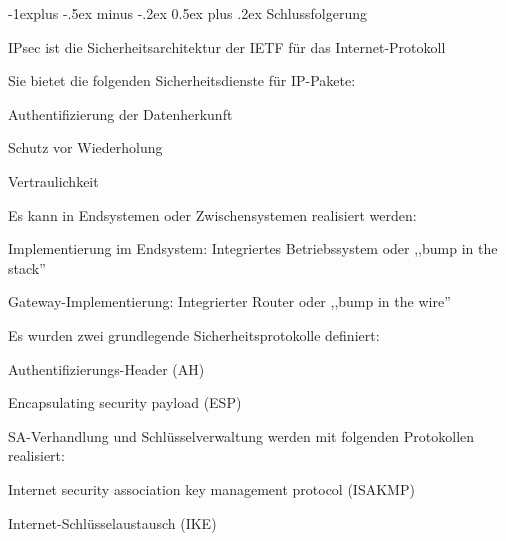 \documentclass[a4paper]{article}
\makeatletter
\renewcommand{\subsection}{\@startsection{subsection}{2}{0mm}%
 {-1explus -.5ex minus -.2ex}%
 {0.5ex plus .2ex}%
 {\normalfont\normalsize\bfseries}}
\makeatother
\begin{document}
\begin{multicols}{3}
      \subsection{Schlussfolgerung}
      \begin{itemize*}
            \item IPsec ist die Sicherheitsarchitektur der IETF für das Internet-Protokoll
            \item Sie bietet die folgenden Sicherheitsdienste für IP-Pakete:
            \begin{itemize*}
                  \item Authentifizierung der Datenherkunft
                  \item Schutz vor Wiederholung
                  \item Vertraulichkeit
            \end{itemize*}
            \item Es kann in Endsystemen oder Zwischensystemen realisiert werden:
            \begin{itemize*}
                  \item Implementierung im Endsystem: Integriertes Betriebssystem oder ,,bump in the stack''
                  \item Gateway-Implementierung: Integrierter Router oder ,,bump in the wire''
            \end{itemize*}
            \item Es wurden zwei grundlegende Sicherheitsprotokolle definiert:
            \begin{itemize*}
                  \item Authentifizierungs-Header (AH)
                  \item Encapsulating security payload (ESP)
            \end{itemize*}
            \item SA-Verhandlung und Schlüsselverwaltung werden mit folgenden
            Protokollen realisiert:
            \begin{itemize*}
                  \item Internet security association key management protocol (ISAKMP)
                  \item Internet-Schlüsselaustausch (IKE)
            \end{itemize*}
      \end{itemize*}


\end{multicols}
\end{document}
